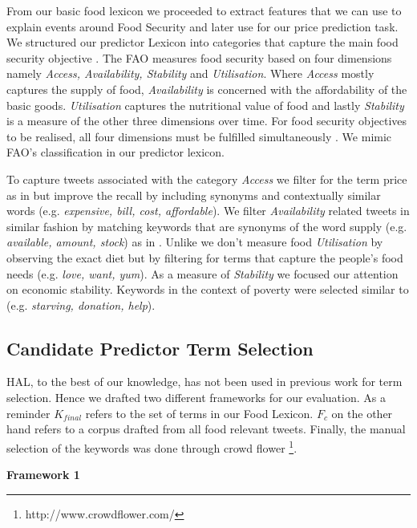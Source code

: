 From our basic food lexicon we proceeded to extract features that we can use to explain events around Food Security and later use for our price prediction task. We structured our predictor Lexicon into categories that capture the main food security objective . The FAO measures food security based on four dimensions namely \emph{Access, Availability, Stability} and \emph{Utilisation}. Where \emph{Access} mostly captures the supply of food, \emph{Availability} is concerned with the affordability of the basic goods. \emph{Utilisation} captures the nutritional value of food and lastly \emph{Stability} is a measure of the other three dimensions over time. For food security objectives to be realised, all four dimensions must be fulfilled simultaneously \cite{fao2008}. We mimic FAO's classification in our predictor lexicon. 

To capture tweets associated with the category \emph{Access} we filter for the term price as in \cite{ungp2013} but improve the recall by including synonyms and contextually similar words (e.g. \emph{expensive, bill, cost, affordable}). We filter \emph{Availability} related tweets in similar fashion by matching keywords that are synonyms of the word supply (e.g. \emph{available, amount, stock}) as in \cite{hum14}. Unlike \cite{AbbarMW14} we don't measure food \emph{Utilisation} by observing the exact diet but by filtering for terms that capture the people's food needs (e.g. \emph{love, want, yum}). As a measure of \emph{Stability} we focused our attention on economic stability. Keywords in the context of poverty were selected similar to \cite{RePEc} \cite{hum14} (e.g. \emph{starving, donation, help}).



\subsection{Candidate Predictor Term Selection}

HAL, to the best of our knowledge, has not been used in previous work for term selection. Hence we drafted two different frameworks for our evaluation. As a reminder $K_{final}$ refers to the set of terms in our Food Lexicon. $F_c$ on the other hand refers to a corpus drafted from all food relevant tweets. Finally, the manual selection of the keywords was done through crowd flower \footnote{http://www.crowdflower.com/}. 


\textbf{Framework 1}

